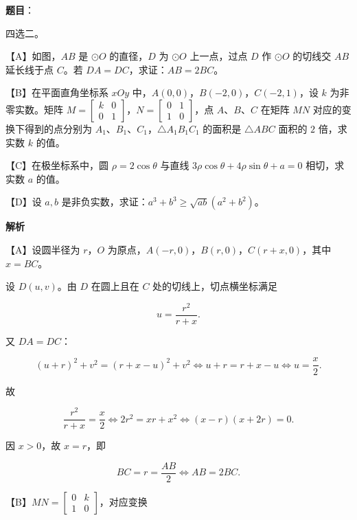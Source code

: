 \begin{answer}

\textbf{题目}：

四选二。

【A】如图，$AB$ 是 $\odot O$ 的直径，$D$ 为 $\odot O$ 上一点，过点 $D$ 作 $\odot O$ 的切线交 $AB$ 延长线于点 $C$。若 $DA=DC$，求证：$AB=2BC$。
\nopagebreak[4]
\begin{center}\end{center}
\nopagebreak[4]
【B】在平面直角坐标系 $xOy$ 中，$A(0,0)$，$B(-2,0)$，$C(-2,1)$，设 $k$ 为非零实数。矩阵 $M=\begin{bmatrix}k&0\\0&1\end{bmatrix}$，$N=\begin{bmatrix}0&1\\1&0\end{bmatrix}$，点 $A$、$B$、$C$ 在矩阵 $MN$ 对应的变换下得到的点分别为 $A_1$、$B_1$、$C_1$，$\triangle A_1B_1C_1$ 的面积是 $\triangle ABC$ 面积的 $2$ 倍，求实数 $k$ 的值。

【C】在极坐标系中，圆 $\rho=2\cos\theta$ 与直线 $3\rho\cos\theta+4\rho\sin\theta+a=0$ 相切，求实数 $a$ 的值。

【D】设 $a,b$ 是非负实数，求证：$a^3+b^3\geqslant\sqrt{ab}(a^2+b^2)$。

\textbf{解析}

【A】设圆半径为 $r$，$O$ 为原点，$A(-r,0)$，$B(r,0)$，$C(r+x,0)$，其中 $x=BC$。

设 $D(u,v)$。由 $D$ 在圆上且在 $C$ 处的切线上，切点横坐标满足

\nopagebreak[4]
\[u=\frac{r^2}{r+x}.\]

又 $DA=DC$：

\nopagebreak[4]
\[(u+r)^2+v^2=(r+x-u)^2+v^2
\iff u+r=r+x-u
\iff u=\frac x2.\]

故

\nopagebreak[4]
\[\frac{r^2}{r+x}=\frac x2
\iff 2r^2=xr+x^2
\iff (x-r)(x+2r)=0.\]

因 $x>0$，故 $x=r$，即

\nopagebreak[4]
\[BC=r=\frac{AB}2\iff AB=2BC.\]

【B】$MN=\begin{bmatrix}0&k\\1&0\end{bmatrix}$，对应变换


\end{answer}

